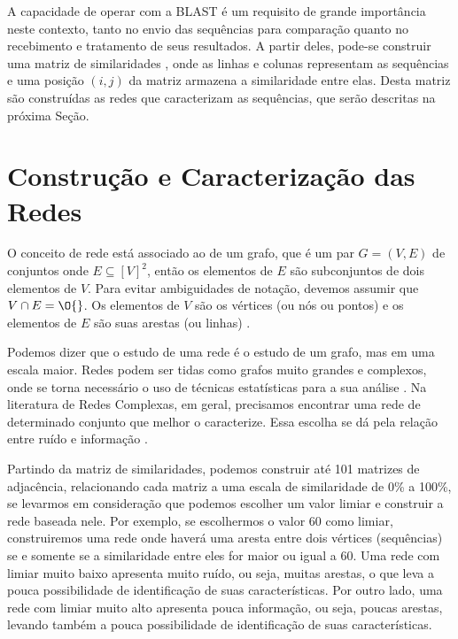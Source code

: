 
A capacidade de operar com a BLAST é um requisito de grande importância neste contexto, tanto no envio das sequências para comparação quanto no recebimento
e tratamento de seus resultados. A partir deles, pode-se construir uma matriz de similaridades \cite{andrade2011}, onde as linhas e colunas representam as
sequências e uma posição $(i, j)$ da matriz armazena a similaridade entre elas. Desta matriz são construídas as redes que caracterizam as sequências, que
serão descritas na próxima Seção.

\section{Construção e Caracterização das Redes} \label{sec:conscarac}

O conceito de rede está associado ao de um grafo, que é um par $G = (V, E)$ de conjuntos onde $E \subseteq [V]^2$, então os elementos de $E$
são subconjuntos de dois elementos de $V$. Para evitar ambiguidades de notação, devemos assumir que $V \cap E = \O{}$. Os elementos de $V$ são os vértices
(ou nós ou pontos) e os elementos de $E$ são suas arestas (ou linhas) \cite{reinhard2010}.

Podemos dizer que o estudo de uma rede é o estudo de um grafo, mas em uma escala maior. Redes podem ser tidas como grafos muito grandes e complexos,
onde se torna necessário o uso de técnicas estatísticas para a sua análise \cite{bessa2008}. Na literatura de Redes Complexas, em geral, precisamos
encontrar uma rede de determinado conjunto que melhor o caracterize. Essa escolha se dá pela relação entre ruído e informação \cite{barabasi2004}.

Partindo da matriz de similaridades, podemos construir até 101 matrizes de adjacência, relacionando cada matriz a uma escala de similaridade
de 0\% a 100\%, se levarmos
em consideração que podemos escolher um valor limiar e construir a rede baseada nele. Por exemplo, se escolhermos o valor 60 como limiar, construiremos uma
rede onde haverá uma aresta entre dois vértices (sequências) se e somente se a similaridade entre eles for maior ou igual a 60. Uma rede com limiar
muito baixo apresenta muito ruído, ou seja, muitas arestas, o que leva a pouca possibilidade de identificação de suas características. Por outro lado, uma
rede com limiar muito alto apresenta pouca informação, ou seja, poucas arestas, levando também a pouca possibilidade de identificação de suas características.

